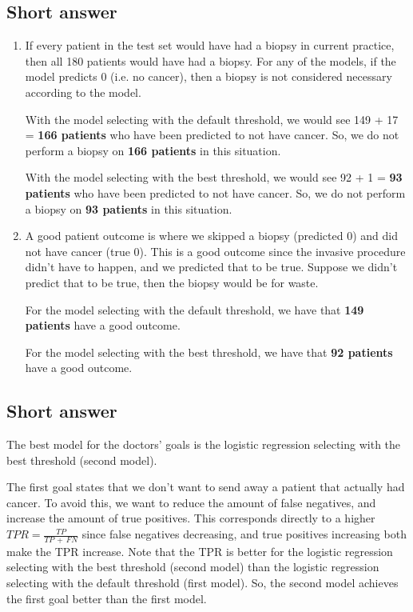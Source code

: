 \documentclass[12pt]{article}
\begin{document}
\subsection{Short answer}
\begin{enumerate}[label=(\roman*)]
    \item If every patient in the test set would have had a biopsy in current
    practice, then all 180 patients would have had a biopsy. For any of the
    models, if the model predicts 0 (i.e. no cancer), then a biopsy is not
    considered necessary according to the model. 

    With the model selecting with the default threshold, we would see 149 + 17
    = \textbf{166 patients} who have been predicted to not have cancer. So,
    we do not perform a biopsy on \textbf{166 patients} in this situation. 

    With the model selecting with the best threshold, we would see 92 + 1 =
    \textbf{93 patients} who have been predicted to not have cancer. So, we do
    not perform a biopsy on \textbf{93 patients} in this situation.

    \item A good patient outcome is where we skipped a biopsy (predicted 0) and
    did not have cancer (true 0). This is a good outcome since the invasive procedure
    didn't have to happen, and we predicted that to be true. Suppose we didn't
    predict that to be true, then the biopsy would be for waste.

    For the model selecting with the default threshold, we have that
    \textbf{149 patients} have a good outcome. 

    For the model selecting with the best threshold, we have that \textbf{92
    patients} have a good outcome.
\end{enumerate} 

\subsection{Short answer}

    The best model for the doctors' goals is the logistic regression
    selecting with the best threshold (second model). 
   
    The first goal states that we don't want to send away a patient that
    actually had cancer. To avoid this, we want to reduce the amount of false
    negatives, and increase the amount of true positives. This corresponds
    directly to a higher $TPR  = \frac{TP}{TP\,+\, FN}$ since false negatives
    decreasing, and true positives increasing both make the TPR increase. Note
    that the TPR is better for the logistic regression selecting with the best
    threshold (second model) than the logistic regression selecting with the default
    threshold (first model). So, the second model achieves the first goal better
    than the first model. 
\end{document}

